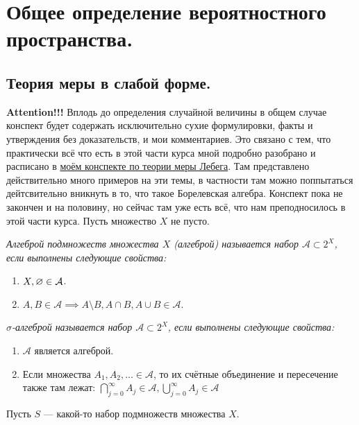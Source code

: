 \usetikzlibrary{arrows}


\section{Общее определение вероятностного пространства.}

\subsection{Теория меры в слабой форме.}
\textbf{Attention!!!} Вплодь до определения случайной величины в общем случае конспект будет содержать исключительно
сухие формулировки, факты и утверждения без доказательств, и мои комментариев. Это связано с тем, что практически всё что есть
в этой части курса мной подробно разобрано и расписано в \href{https://raw.githubusercontent.com/johanDDC/My_TeXs/5981fbe92fbd8dfae37ea2c29fbf204a942d0d09/pdf/Lebeg/Lebeg.pdf}{моём конспекте по теории меры Лебега}.
Там представлено действительно много примеров на эти темы, в частности там можно поппытаться дейтсвительно вникнуть в то,
что такое Борелевская алгебра. Конспект пока не закончен и на половину, но сейчас там уже есть всё, что нам
преподносилось в этой части курса.
Пусть множество $X$ не пусто.
\begin{definition}
    \it{Алгеброй подмножеств множества $X$} (алгеброй) называется набор $\mathcal{A} \subset 2^X$, если выполнены следующие свойства:
    \begin{enumerate}
        \item $X, \varnothing \in \mathcal{A}$.
        \item $A, B \in \mathcal{A} \implies A \setminus B, A \cap B, A \cup B \in \mathcal{A}$.
    \end{enumerate}
\end{definition}
\begin{definition}
    \it{$\sigma$-алгеброй} называется набор $\mathcal{A} \subset 2^X$, если выполнены следующие свойства:
    \begin{enumerate}
        \item $\mathcal{A}$ является алгеброй.
        \item Если множества $A_1, A_2, \ldots \in \mathcal{A}$, то их счётные объединение и пересечение также
        там лежат: $\bigcap_{j = 0}^{\infty} A_j \in \mathcal{A}, \bigcup_{j = 0}^{\infty} A_j \in \mathcal{A}$
    \end{enumerate}
\end{definition}
Пусть $S$ --- какой-то набор подмножеств множества $X$.
